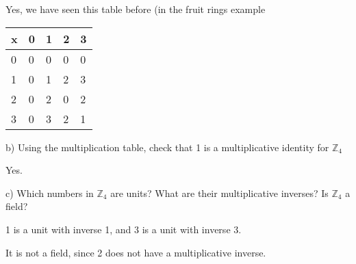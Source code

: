 \documentclass[11pt]{article}
\begin{document}
\begin{itemize}
		Yes, we have seen this table before (in the fruit rings example

\begin{tabular}{l|l l l l}

x & 0 & 1 & 2 & 3\\

\hline

0 & 0	& 0 & 0 & 0\\

1	& 0	& 1 & 2 & 3\\

2	& 0	&	2	&	0 & 2\\
3 & 0 & 3 & 2 & 1\\

\end{tabular}


		b) Using the multiplication table, check that 1 is a multiplicative identity for $\mathbb{Z}_4$

	Yes.

		c) Which numbers in $\mathbb{Z}_4$ are units? What are their multiplicative inverses? Is $\mathbb{Z}_4$ a field?

		1 is a unit with inverse 1, and 3 is a unit with inverse 3. 

		It is not a field, since 2 does not have a multiplicative inverse.
\end{itemize}
\end{document}
